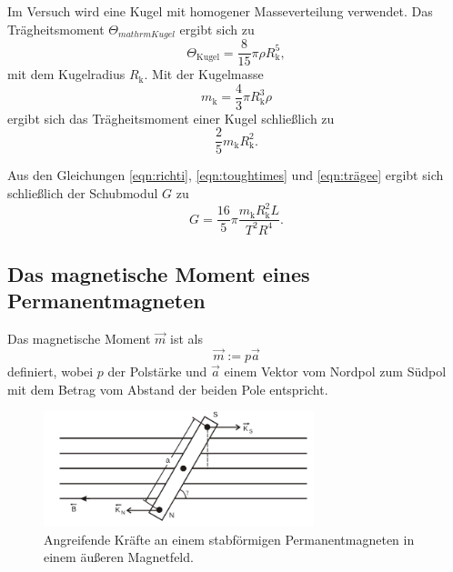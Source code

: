 Im Versuch wird eine Kugel mit homogener Masseverteilung verwendet.
Das Trägheitsmoment $\Theta_{mathrm{Kugel}}$ ergibt sich zu
\begin{equation*}
	\Theta_{\mathrm{Kugel}} = \frac{8}{15} \pi \rho R_{\mathrm{k}}^5 \mathrm{,}
\end{equation*}
mit dem Kugelradius $R_{\mathrm{k}}$.
Mit der Kugelmasse
\begin{equation*}
	m_{\mathrm{k}} = \frac{4}{3} \pi R_{\mathrm{k}}^3 \rho
\end{equation*}
ergibt sich das Trägheitsmoment einer Kugel schließlich zu
\begin{equation}
	\label{eqn:trägee}
	\frac{2}{5} m_{\mathrm{k}} R_{\mathrm{k}}^2 \mathrm{.}
\end{equation}

Aus den Gleichungen \eqref{eqn:richti}, \eqref{eqn:toughtimes} und \eqref{eqn:trägee} ergibt
sich schließlich der Schubmodul $G$ zu
\begin{equation}
	\label{eqn:schubischu}
	G = \frac{16}{5} \pi \frac{m_{\mathrm{k}} R_{\mathrm{k}}^2 L}{T^2 R^4} \mathrm{.}
\end{equation}


\FloatBarrier
\subsection{Das magnetische Moment eines Permanentmagneten}
\FloatBarrier
Das magnetische Moment $\vec{m}$ ist als
\begin{equation}
	\vec{m} := p \vec{a}
\end{equation}
definiert, wobei $p$ der Polstärke und $\vec{a}$ einem Vektor vom Nordpol zum Südpol mit dem
Betrag vom Abstand der beiden Pole entspricht.
\begin{figure}
	\centering
	\includegraphics[width=0.7\textwidth]{Bilder/Magnet.png}
	\caption{Angreifende Kräfte an einem stabförmigen Permanentmagneten in einem äußeren Magnetfeld. \cite{Anleitung}}
	\label{fig:magnetus}
\end{figure}


